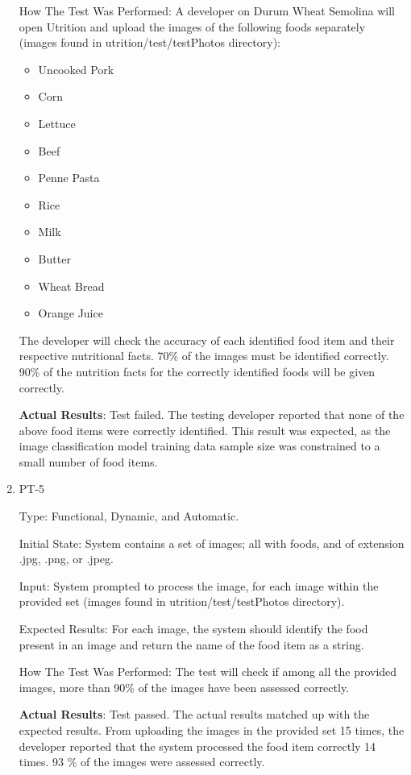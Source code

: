 \documentclass[12pt, titlepage]{article}
\begin{document}
\begin{enumerate}
		How The Test Was Performed: A developer on Durum Wheat Semolina will open Utrition and upload the images of the following foods separately (images found in utrition/test/testPhotos directory):
		\begin{itemize}
			\item Uncooked Pork
			\item Corn
			\item Lettuce
			\item Beef
			\item Penne Pasta
			\item Rice
			\item Milk
			\item Butter
			\item Wheat Bread
			\item Orange Juice
		\end{itemize} 
		
		The developer will check the accuracy of each identified food item and 
		their respective nutritional facts. 70\% of the images must be identified correctly. 90\% of the nutrition facts for the correctly identified foods will be given correctly.
		
		\textbf{Actual Results}: Test failed. The testing developer reported that none of the above food items were correctly identified. This result was expected, as the image classification model training data sample size was constrained to a small number of food items.
		
		\item{PT-5}
		
		Type: Functional, Dynamic, and Automatic.
		
		Initial State: System contains a set of images; all with foods, and of 
		extension .jpg, .png, or .jpeg.
		
		Input: System prompted to process the image, for each image 
		within the provided set (images found in utrition/test/testPhotos directory).
		
		Expected Results: For each image, the system should identify the food 
		present in an image and return the name of the food item as a string.
		
		How The Test Was Performed: The test will check if among all the 
		provided images, more than 90\% of the images have been assessed 
		correctly.
		
		\textbf{Actual Results}: Test passed. The actual results matched up with the expected results. From uploading the images in the provided set 15 times, the developer reported that the system processed the food item correctly 14 times. 93 \% of the images were assessed correctly.
		

\end{enumerate}
\end{document}
